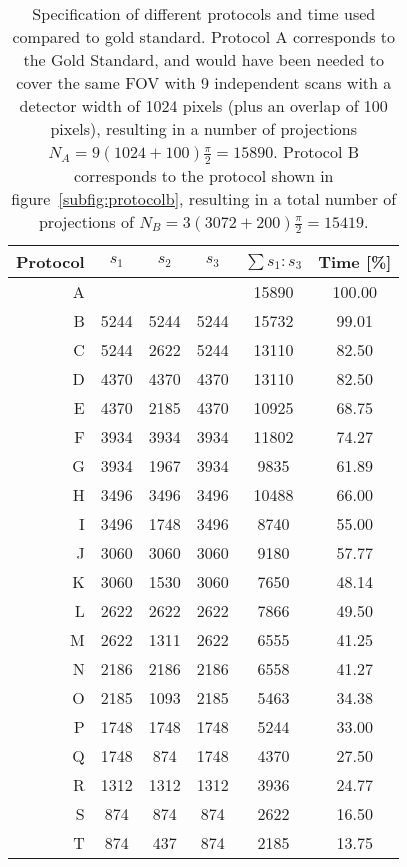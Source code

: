 \begin{table}
	\centering
	\caption{Specification of different protocols and time used compared to gold standard. Protocol A corresponds to the Gold Standard, and would have been needed to cover the same FOV with 9 independent scans with a detector width of 1024 pixels (plus an overlap of 100 pixels), resulting in a number of projections $N_{A}=9(1024+100)\frac{\pi}{2}=15890$. Protocol B corresponds to the protocol shown in figure~\ref{subfig:protocolb}, resulting in a total number of projections of $N_{B}=3(3072+200)\frac{\pi}{2}=15419$.}%
	\begin{tabular}{rccccc}
	\toprule
		Protocol & $s_{1}$ & $s_{2}$ & $s_{3}$ & $\sum s_{1}:s_{3}$ & Time [\%] \\
	\midrule
		A &      &      &      & 15890 & 100.00 \\
		B & 5244 & 5244 & 5244 & 15732 & 99.01 \\
		C & 5244 & 2622 & 5244 & 13110 & 82.50 \\
		D & 4370 & 4370 & 4370 & 13110 & 82.50 \\
		E & 4370 & 2185 & 4370 & 10925 & 68.75 \\
		F & 3934 & 3934 & 3934 & 11802 & 74.27 \\
		G & 3934 & 1967 & 3934 &  9835 & 61.89 \\
		H & 3496 & 3496 & 3496 & 10488 & 66.00 \\
		I & 3496 & 1748 & 3496 &  8740 & 55.00 \\
		J & 3060 & 3060 & 3060 &  9180 & 57.77 \\
		K & 3060 & 1530 & 3060 &  7650 & 48.14 \\
		L & 2622 & 2622 & 2622 &  7866 & 49.50 \\
		M & 2622 & 1311 & 2622 &  6555 & 41.25 \\
		N & 2186 & 2186 & 2186 &  6558 & 41.27 \\
		O & 2185 & 1093 & 2185 &  5463 & 34.38 \\
		P & 1748 & 1748 & 1748 &  5244 & 33.00 \\
		Q & 1748 &  874 & 1748 &  4370 & 27.50 \\
		R & 1312 & 1312 & 1312 &  3936 & 24.77 \\
		S &  874 &  874 &  874 &  2622 & 16.50 \\
		T &  874 &  437 &  874 &  2185 & 13.75 \\
	\bottomrule
	\end{tabular}
\end{table}

